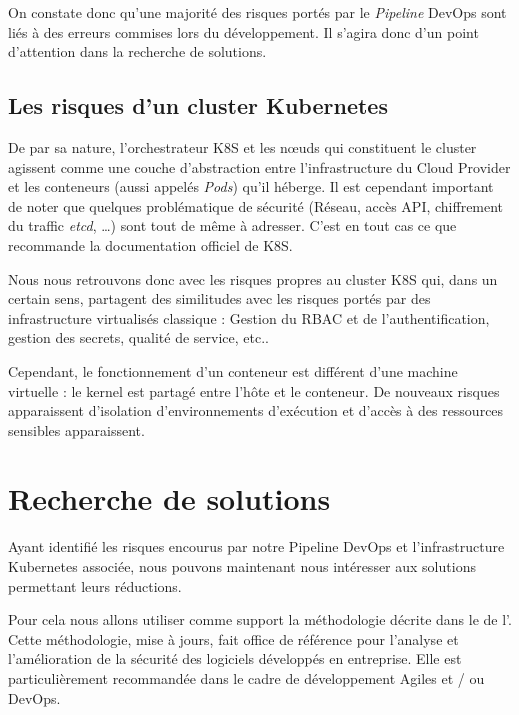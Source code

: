On constate donc qu'une majorité des risques portés par le \emph{Pipeline} DevOps sont liés à des erreurs commises lors
du développement. Il s'agira donc d'un point d'attention dans la recherche de solutions.

\subsection{Les risques d'un cluster Kubernetes}
De par sa nature, l'orchestrateur \ac{K8S} et les nœuds qui constituent le cluster agissent comme une couche 
d'abstraction entre l'infrastructure du Cloud Provider et les conteneurs (aussi appelés \emph{Pods}) qu'il héberge.
\newline Il est cependant important de noter que quelques problématique de sécurité (\eg Réseau, accès API, chiffrement 
du traffic \emph{etcd}, \dots) sont tout de même à adresser. C'est en tout cas ce que recommande la documentation 
officiel de \ac{K8S}\autocite{k8s_security_2021}.

Nous nous retrouvons donc avec les risques propres au cluster \ac{K8S} qui, dans un certain sens, partagent des similitudes
avec les risques portés par des infrastructure virtualisés classique : Gestion du \ac{RBAC} et de l'authentification, 
gestion des secrets, qualité de service, etc..

Cependant, le fonctionnement d'un conteneur est différent d'une machine virtuelle : le kernel est partagé entre l'hôte et
le conteneur. De nouveaux risques apparaissent d'isolation d'environnements d'exécution et d'accès à des ressources 
sensibles apparaissent. 

\newpage

\section{Recherche de solutions}

Ayant identifié les risques encourus par notre Pipeline DevOps et l'infrastructure Kubernetes associée,
nous pouvons maintenant nous intéresser aux solutions permettant leurs réductions.

Pour cela nous allons utiliser comme support la méthodologie décrite dans le 
\autocite{samm_v2.0_owasp_project_2021}
de l'\citeauthor{samm_v2.0_owasp_project_2021}. Cette méthodologie, mise à jours, fait office de référence pour l'analyse
et l'amélioration de la sécurité des logiciels développés en entreprise.
\newline Elle est particulièrement recommandée dans le cadre de développement Agiles et / ou \linebreak DevOps.

